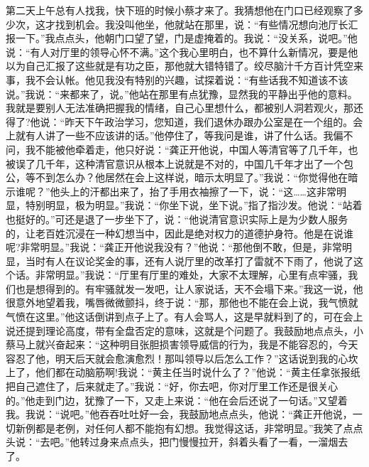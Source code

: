 \documentclass[12pt,oneside]{book}
\begin{document}
第二天上午总有人找我，快下班的时候小蔡才来了。我猜想他在门口已经观察了多少次，这才找到机会。我没叫他坐，他就站在那里，说：``有些情况想向池厅长汇报一下。''我点点头，他朝门口望了望，门是虚掩着的。我说：``没关系，说吧。''他说：``有人对厅里的领导心怀不满。''这个我心里明白，也不算什么新情况，要是他以为自己汇报了这些就是有功之臣，那他就大错特错了。绞尽脑汁千方百计凭空来事，我不会认帐。他见我没有特别的兴趣，试探着说：``有些话我不知道该不该说。''我说：``来都来了，说。''他站在那里有点犹豫，显然我的平静出乎他的意料。我就是要别人无法准确把握我的情绪，自己心里想什么，都被别人洞若观火，那还得了?他说：``昨天下午政治学习，您知道，我们退休办跟办公室是在一个组的。会上就有人讲了一些不应该讲的话。''他停住了，等我问是谁，讲了什么话。我偏不问，我不能被他牵着走，他只好说：``龚正开他说，中国人等清官等了几千年，也被误了几千年，这种清官意识从根本上说就是不对的，中国几千年才出了一个包公，等不到怎么办？他居然在会上这样说，暗示太明显了。''我说：``你觉得他在暗示谁呢？''他头上的汗都出来了，抬了手用衣袖擦了一下，说：``这\ldots\ldots 这非常明显，特别明显，极为明显。''我说：``你坐下说，坐下说。''指了指沙发。他说：``站着也挺好的。''可还是退了一步坐下了，说：``他说清官意识实际上是为少数人服务的，让老百姓沉浸在一种幻想当中，因此是绝对权力的道德护身符。他是在说谁呢?非常明显。''我说：``龚正开他说我没有？''他说：``那他倒不敢，但是，非常明显，当时有人在议论奖金的事，还有人说厅里的改革打了雷就不下雨了，他说了这个话。非常明显。''我说：``厅里有厅里的难处，大家不太理解，心里有点牢骚，我们也是想得到的。有牢骚就发一发吧，让人家说话，天不会塌下来。''我这一说，他很意外地望着我，嘴唇微微颤抖，终于说：``那，那他也不能在会上说，我气愤就气愤在这里。''他这话倒讲到点子上了。有人会骂人，这是早就料到了的，可在会上说还提到理论高度，带有全盘否定的意味，这就是个问题了。我鼓励地点点头，小蔡马上就兴奋起来：``这种明目张胆损害领导威信的行为，我是不能容忍的，今天容忍了他，明天后天就会愈演愈烈！那叫领导以后怎么工作？''这话说到我的心坎上了，他们都在动脑筋啊!我说：``黄主任当时说什么了？''他说：``黄主任拿张报纸把自己遮住了，后来就走了。''我说：``好，你去吧，你对厅里工作还是很关心的。''他走到门边，犹豫了一下，又走上来说：``他在会后还说了一句话。''又望着我。我说：``说吧。''他吞吞吐吐好一会，我鼓励地点点头，他说：``龚正开他说，一切新例都是老例，对任何人都不能抱有幻想。我觉得这话，非常明显。''我笑了点点头说：``去吧。''他转过身来点点头，把门慢慢拉开，斜着头看了一看，一溜烟去了。
\end{document}
